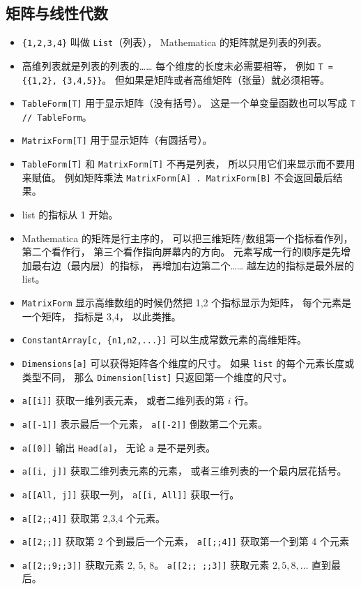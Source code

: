 \subsection{矩阵与线性代数}
\begin{itemize}
\item \verb|{1,2,3,4}| 叫做 \verb|List|（列表）， Mathematica 的矩阵就是列表的列表。
\item 高维列表就是列表的列表的…… 每个维度的长度未必需要相等， 例如 \verb|T = {{1,2}, {3,4,5}}|。 但如果是矩阵或者高维矩阵（张量）就必须相等。
\item \verb|TableForm[T]| 用于显示矩阵（没有括号）。 这是一个单变量函数也可以写成 \verb|T // TableForm|。
\item \verb|MatrixForm[T]| 用于显示矩阵（有圆括号）。
\item \verb|TableForm[T]| 和 \verb|MatrixForm[T]| 不再是列表， 所以只用它们来显示而不要用来赋值。 例如矩阵乘法 \verb|MatrixForm[A] . MatrixForm[B]| 不会返回最后结果。
\item list 的指标从 1 开始。
\item Mathematica 的矩阵是行主序的， 可以把三维矩阵/数组第一个指标看作列， 第二个看作行， 第三个看作指向屏幕内的方向。 元素写成一行的顺序是先增加最右边（最内层）的指标， 再增加右边第二个…… 越左边的指标是最外层的 list。
\item \verb|MatrixForm| 显示高维数组的时候仍然把 1,2 个指标显示为矩阵， 每个元素是一个矩阵， 指标是 3,4， 以此类推。
\item \verb|ConstantArray[c, {n1,n2,...}]| 可以生成常数元素的高维矩阵。
\item \verb|Dimensions[a]| 可以获得矩阵各个维度的尺寸。 如果 \verb|list| 的每个元素长度或类型不同， 那么 \verb|Dimension[list]| 只返回第一个维度的尺寸。
\item \verb|a[[i]]| 获取一维列表元素， 或者二维列表的第 $i$ 行。
\item \verb|a[[-1]]| 表示最后一个元素， \verb|a[[-2]]| 倒数第二个元素。
\item \verb|a[[0]]| 输出 \verb|Head[a]|， 无论 \verb|a| 是不是列表。
\item \verb|a[[i, j]]| 获取二维列表元素的元素， 或者三维列表的一个最内层花括号。
\item \verb|a[[All, j]]| 获取一列， \verb|a[[i, All]]| 获取一行。
\item \verb|a[[2;;4]]| 获取第 2,3,4 个元素。
\item \verb|a[[2;;]]| 获取第 2 个到最后一个元素， \verb|a[[;;4]]| 获取第一个到第 4 个元素
\item \verb|a[[2;;9;;3]]| 获取元素 2, 5, 8。 \verb|a[[2;; ;;3]]| 获取元素 $2, 5, 8, \dots$ 直到最后。

\end{itemize}
